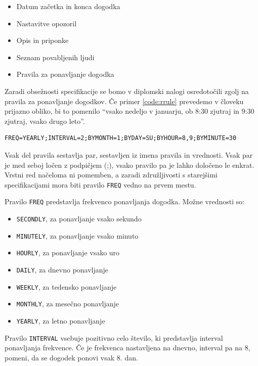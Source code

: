 \begin{itemize}
  \item Datum začetka in konca dogodka
  \item Nastavitve opozoril
  \item Opis in priponke
  \item Seznam povabljenih ljudi
  \item Pravila za ponavljanje dogodka
\end{itemize}

Zaradi obsežnosti specifikacije se bomo v diplomski nalogi osredotočili zgolj na pravila za ponavljanje dogodkov\cite{rrule}. Če primer \ref{code:rrule} prevedemo v človeku prijazno obliko, bi to pomenilo ``vsako nedeljo v januarju, ob 8:30 zjutraj in 9:30 zjutraj, vsako drugo leto''.

\begin{lstlisting}[caption=Primer uporabe pravila RRULE spefikiacije RFC 5545., label=code:rrule]
FREQ=YEARLY;INTERVAL=2;BYMONTH=1;BYDAY=SU;BYHOUR=8,9;BYMINUTE=30
\end{lstlisting}

Vsak del pravila sestavlja par, sestavljen iz imena pravila in vrednosti. Vsak par je med seboj ločen z podpičjem (;), vsako pravilo pa je lahko določeno le enkrat. Vrstni red načeloma ni pomemben, a zaradi združljivosti s starejšimi specifikacijami mora biti pravilo \texttt{FREQ} vedno na prvem mestu.

Pravilo \texttt{FREQ} predstavlja frekvenco ponavljanja dogodka. Možne vrednosti so:

\begin{itemize}
  \item \texttt{SECONDLY}, za ponavljanje vsako sekundo
  \item \texttt{MINUTELY}, za ponavljanje vsako minuto
  \item \texttt{HOURLY}, za ponavljanje vsako uro
  \item \texttt{DAILY}, za dnevno ponavljanje
  \item \texttt{WEEKLY}, za tedensko ponavljanje
  \item \texttt{MONTHLY}, za mesečno ponavljanje
  \item \texttt{YEARLY}, za letno ponavljanje
\end{itemize}

Pravilo \texttt{INTERVAL} vsebuje pozitivno celo število, ki predstavlja interval ponavljanja frekvence. Če je frekvenca nastavljena na dnevno, interval pa na 8, pomeni, da se dogodek ponovi vsak 8. dan.

